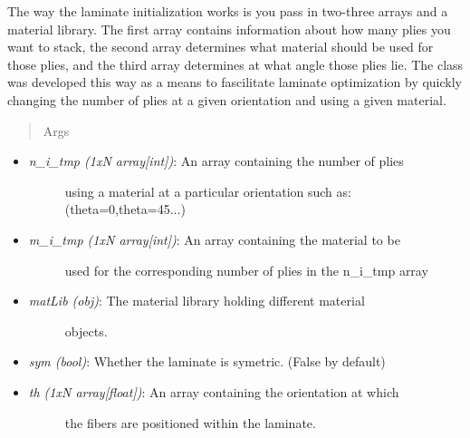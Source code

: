 \documentclass[letterpaper,10pt,english]{sphinxmanual}
\begin{document}
\begin{fulllineitems}
\begin{fulllineitems}
The way the laminate initialization works is you pass in two-three
arrays and a material library. The first array contains information
about how many plies you want to stack, the second array determines
what material should be used for those plies, and the third array
determines at what angle those plies lie. The class was developed this
way as a means to fascilitate laminate optimization by quickly changing
the number of plies at a given orientation and using a given material.
\begin{quote}\begin{description}
\item[{Args}] \leavevmode
\end{description}\end{quote}
\begin{itemize}
\item {} \begin{description}
\item[{\emph{n\_i\_tmp (1xN array{[}int{]})}: An array containing the number of plies}] \leavevmode
using a material at a particular orientation such as:
(theta=0,theta=45...)

\end{description}

\item {} \begin{description}
\item[{\emph{m\_i\_tmp (1xN array{[}int{]})}: An array containing the material to be}] \leavevmode
used for the corresponding number of plies in the n\_i\_tmp array

\end{description}

\item {} \begin{description}
\item[{\emph{matLib (obj)}: The material library holding different material}] \leavevmode
objects.

\end{description}

\item {} 
\emph{sym (bool)}: Whether the laminate is symetric. (False by default)

\item {} \begin{description}
\item[{\emph{th (1xN array{[}float{]})}: An array containing the orientation at which}] \leavevmode
the fibers are positioned within the laminate.


\end{description}
\end{itemize}
\end{fulllineitems}
\end{fulllineitems}
\end{document}
